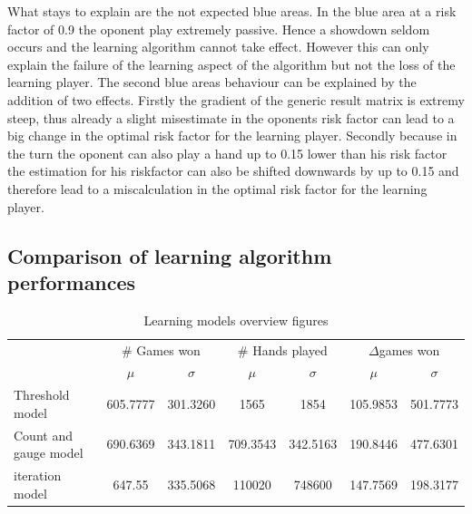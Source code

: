 \documentclass[11pt]{article}
\begin{document}
What stays to explain are the not expected blue areas. In the blue area at a risk factor of 0.9 the oponent play extremely passive. Hence a showdown seldom occurs and the learning algorithm cannot take effect. However this can only explain the failure of the learning aspect of the algorithm but not the loss of the learning player. The second blue areas behaviour can be explained by the addition of two effects. Firstly the gradient of the generic result matrix is extremy steep, thus already a slight misestimate in the oponents risk factor can lead to a big change in the optimal risk factor for the learning player. Secondly because in the turn the oponent can also play a hand up to 0.15 lower than his risk factor the estimation for his riskfactor can also be shifted downwards by up to 0.15 and therefore lead to a miscalculation in the optimal risk factor for the learning player.


\subsection{Comparison of learning algorithm performances}


\begin{table}[]
\centering
\caption{Learning models overview figures}
\label{Learning models overview}
\begin{tabular}{lcccccc}
\cline{2-7}
                                           & \multicolumn{2}{c}{\# Games won}                      & \multicolumn{2}{c}{\# Hands played}                   & \multicolumn{2}{c}{$\Delta$games won} \\ \cline{2-7} 
\multicolumn{1}{c|}{}                       & \multicolumn{1}{c|}{$\mu$} & \multicolumn{1}{c|}{$\sigma$} & \multicolumn{1}{c|}{$\mu$} & \multicolumn{1}{c|}{$\sigma$} & \multicolumn{1}{c|}{$\mu$} & $\sigma$ \\ \hline
\multicolumn{1}{l|}{Threshold model}       & 605.7777                   & \multicolumn{1}{c|}{301.3260} & 1565                       & \multicolumn{1}{c|}{1854}     & 105.9853                   & 501.7773 \\ \hline
\multicolumn{1}{l|}{Count and gauge model} & 690.6369                   & \multicolumn{1}{c|}{343.1811} & 709.3543                   & \multicolumn{1}{c|}{342.5163} & 190.8446                   & 477.6301 \\ \hline
\multicolumn{1}{l|}{iteration model}           & 647.55                     & \multicolumn{1}{c|}{335.5068}         & 110020                     & \multicolumn{1}{c|}{748600}   & 147.7569                            & 198.3177        \\ \hline

\end{tabular}
\end{table}
\end{document}
